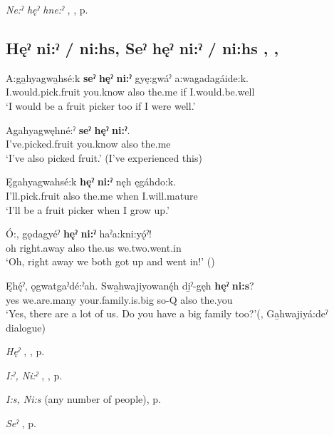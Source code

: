 \begin{CayugaRelated}
\item \textit{Ne:ˀ hęˀ hne:ˀ} , , p. \pageref{p:[ne:ˀ hęˀ hne:ˀ]}
\end{CayugaRelated}

\subsection*{\textbf{Hęˀ ni:ˀ / ni:hs, Seˀ hęˀ ni:ˀ / ni:hs} , , } \label{p:[hęˀ ni:ˀ]}

\ea
\label{ex:hpar23}
\gll A:ga̱hyagwa̱hsé:k \textbf{seˀ} \textbf{hęˀ} \textbf{ni:ˀ} gyę:gwáˀ a:wagadagáide:k.\\
I.would.pick.fruit you.know also the.me if I.would.be.well\\
\glt ‘I would be a fruit picker too if I were well.’
\z

\ea
\label{ex:hpar24}
\gll Agahyagwęhné:ˀ \textbf{seˀ} \textbf{hęˀ} \textbf{ni:ˀ}.\\
I’ve.picked.fruit you.know also the.me\\
\glt ‘I’ve also picked fruit.’ (I’ve experienced this)
\z


\ea
\label{ex:hpar25}
\gll Ęgahyagwahsé:k \textbf{hęˀ} \textbf{ni:ˀ} nęh ęgáhdo:k.\\
I’ll.pick.fruit also the.me when I.will.mature\\
\glt ‘I’ll be a fruit picker when I grow up.’
\z


\ea
\label{ex:hpar26}
\gll Ó:, gǫdagyéˀ \textbf{hęˀ} \textbf{ni:ˀ} haˀa:kni:yǫ́ˀ!\\
oh right.away also the.us we.two.went.in\\
\glt ‘Oh, right away we both got up and went in!’ (\cite{henry_de_2005})
\z


\ea
\label{ex:hpar27}
\gll Ęhę́ˀ, ǫgwatgaˀdé:ˀah. Swa̱hwajiyowanę́h di̱ˀ-gęh \textbf{hęˀ} \textbf{ni:s}?\\
yes we.are.many your.family.is.big so-Q also the.you\\
\glt ‘Yes, there are a lot of us. Do you have a big family too?’(\cite[257]{mithun_watewayestanih_1984}, Ga̱hwajiyá:deˀ dialogue)
\z


\begin{CayugaRelated}
\item \textit{Hęˀ} , , p. \pageref{p:[hęˀ]}\\
\item \textit{I:ˀ, Ni:ˀ} , , p. \pageref{p:[i:ˀ]}\\
\item \textit{I:s, Ni:s}  (any number of people), p. \pageref{p:[i:s]}\\
\item \textit{Seˀ} , p. \pageref{p:[seˀ]}
\end{CayugaRelated}

